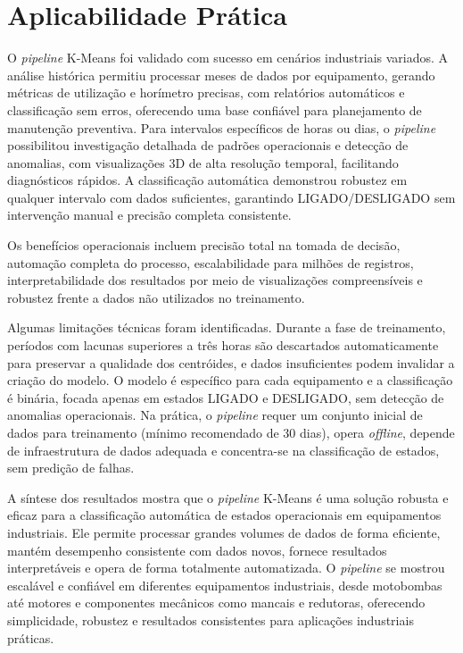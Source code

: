 \section{Aplicabilidade Prática}

O \textit{pipeline} K-Means foi validado com sucesso em cenários industriais variados. A análise histórica permitiu processar meses de dados por equipamento, gerando métricas de utilização e horímetro precisas, com relatórios automáticos e classificação sem erros, oferecendo uma base confiável para planejamento de manutenção preventiva. Para intervalos específicos de horas ou dias, o \textit{pipeline} possibilitou investigação detalhada de padrões operacionais e detecção de anomalias, com visualizações 3D de alta resolução temporal, facilitando diagnósticos rápidos. A classificação automática demonstrou robustez em qualquer intervalo com dados suficientes, garantindo LIGADO/DESLIGADO sem intervenção manual e precisão completa consistente.

Os benefícios operacionais incluem precisão total na tomada de decisão, automação completa do processo, escalabilidade para milhões de registros, interpretabilidade dos resultados por meio de visualizações compreensíveis e robustez frente a dados não utilizados no treinamento.

Algumas limitações técnicas foram identificadas. Durante a fase de treinamento, períodos com lacunas superiores a três horas são descartados automaticamente para preservar a qualidade dos centróides, e dados insuficientes podem invalidar a criação do modelo. O modelo é específico para cada equipamento e a classificação é binária, focada apenas em estados LIGADO e DESLIGADO, sem detecção de anomalias operacionais. Na prática, o \textit{pipeline} requer um conjunto inicial de dados para treinamento (mínimo recomendado de 30 dias), opera \textit{offline}, depende de infraestrutura de dados adequada e concentra-se na classificação de estados, sem predição de falhas.

A síntese dos resultados mostra que o \textit{pipeline} K-Means é uma solução robusta e eficaz para a classificação automática de estados operacionais em equipamentos industriais. Ele permite processar grandes volumes de dados de forma eficiente, mantém desempenho consistente com dados novos, fornece resultados interpretáveis e opera de forma totalmente automatizada. O \textit{pipeline} se mostrou escalável e confiável em diferentes equipamentos industriais, desde motobombas até motores e componentes mecânicos como mancais e redutoras, oferecendo simplicidade, robustez e resultados consistentes para aplicações industriais práticas.